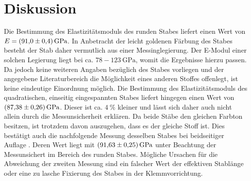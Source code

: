 
\section{Diskussion}
\label{sec:Diskussion}
Die Bestimmung des Elastizitätsmoduls des runden Stabes liefert einen Wert von
 $E = \SI{91.0 \pm 0.4}{\giga\pascal}$. In Anbetracht der leicht goldenen Färbung
  des Stabes besteht der Stab daher vermutlich aus einer Messinglegierung. Der
  E-Modul einer solchen Legierung liegt bei ca. $78 - \SI{123}{\giga\pascal}$\cite{Elastizitätsmodul},
   womit die Ergebnisse hierzu passen.
  Da jedoch keine weiteren Angaben bezüglich des Stabes vorliegen und der
  angegebene Literaturbereich die Möglichkeit eines anderen Stoffes offenlegt,
  ist keine eindeutige Einordnung möglich. Die Bestimmung des Elastizitätsmoduls
   des quadratischen, einseitig eingespannten Stabes liefert hingegen einen Wert
    von $\SI{87.38 \pm 0.26}{\giga\pascal}$. Dieser ist ca. $\SI{4}{\percent}$ kleiner und lässt sich daher auch
    nicht allein durch die Messunsicherheit erklären. Da beide Stäbe den gleichen Farbton
     besitzen, ist trotzdem davon auszugehen, dass es der gleiche Stoff ist. Dies bestätigt auch
      die nachfolgende Messung desselben Stabes bei beidseitiger Auflage
       . Deren Wert liegt mit $\SI{91.63 \pm 0.25}{\giga\pascal}$ unter Beachtung
       der Messunsichert im Bereich des runden Stabes. Mögliche Ursachen
         für die Abweichung der zweiten Messung sind ein falscher Wert der
         effektiven Stablänge oder eine zu lasche Fixierung des Stabes in der
          Klemmvorrichtung.
